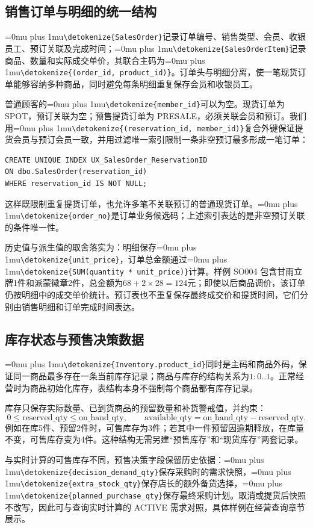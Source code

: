 \documentclass{SYSUReport}
\newcommand{\code}[1]{\begingroup\Urlmuskip=0mu plus 1mu\expandafter\nolinkurl\expandafter{\detokenize{#1}}\endgroup}
\begin{document}
\subsection{销售订单与明细的统一结构}
\code{SalesOrder}记录订单编号、销售类型、会员、收银员工、预订关联及完成时间；\code{SalesOrderItem}记录商品、数量和实际成交单价，其联合主码为\code{(order_id, product_id)}。订单头与明细分离，使一笔现货订单能够容纳多种商品，同时避免每条明细重复保存会员和收银员工。

普通顾客的\code{member_id}可以为空。现货订单为 SPOT，预订关联为空；预售提货订单为 PRESALE，必须关联会员和预订。我们用\code{(reservation_id, member_id)}复合外键保证提货会员与预订会员一致，并用过滤唯一索引限制一条非空预订最多形成一笔订单：
\par{}\noindent\begin{minipage}{\linewidth}
\begin{lstlisting}
CREATE UNIQUE INDEX UX_SalesOrder_ReservationID
ON dbo.SalesOrder(reservation_id)
WHERE reservation_id IS NOT NULL;
\end{lstlisting}
\end{minipage}\par{}
这样既限制重复提货订单，也允许多笔不关联预订的普通现货订单。\code{order_no}是订单业务候选码；上述索引表达的是非空预订关联的条件唯一性。

历史值与派生值的取舍落实为：明细保存\code{unit_price}，订单总金额通过\code{SUM(quantity * unit_price)}计算。样例 SO004 包含甘雨立牌1件和派蒙徽章2件，总金额为\(68+2\times28=124\)元；即使以后商品调价，该订单仍按明细中的成交单价统计。预订表也不重复保存最终成交价和提货时间，它们分别由销售明细和订单完成时间表达。

\subsection{库存状态与预售决策数据}
\code{Inventory.product_id}同时是主码和商品外码，保证同一商品最多存在一条当前库存记录；商品与库存的结构关系为\(1:0..1\)。正常经营时为商品初始化库存，表结构本身不强制每个商品都有库存记录。

库存只保存实际数量、已到货商品的预留数量和补货警戒值，并约束：
\[
0\leq\text{reserved\_qty}\leq\text{on\_hand\_qty},\qquad
\text{available\_qty}=\text{on\_hand\_qty}-\text{reserved\_qty}.
\]
例如在库5件、预留2件时，可售库存为3件；若其中一件预留因逾期释放，在库量不变，可售库存变为4件。这种结构无需另建“预售库存”和“现货库存”两套记录。

与实时计算的可售库存不同，预售决策字段保留历史依据：\code{decision_demand_qty}保存采购时的需求快照，\code{extra_stock_qty}保存店长的额外备货选择，\code{planned_purchase_qty}保存最终采购计划。取消或提货后快照不改写，因此可与查询实时计算的 ACTIVE 需求对照，具体样例在经营查询章节展示。
\end{document}
